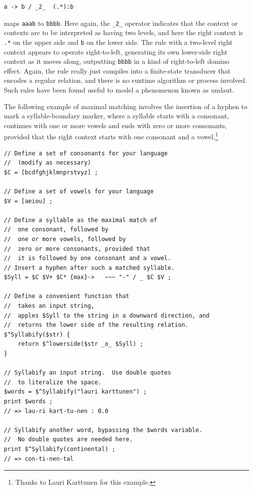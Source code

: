 \begin{Verbatim}
a -> b / _2_  (.*):b
\end{Verbatim}

\noindent
maps \texttt{aaab} to \texttt{bbbb}.  Here again, the \verb!_2_! operator indicates that the context or contexts are to
be interpreted as having two levels, and here the right context is \verb!.*! on the upper side and \verb!b! on the lower
side.  The rule with a two-level right context appears to
operate right-to-left, generating its own lower-side right context as it moves along, outputting \texttt{bbbb} in a kind
of right-to-left domino effect.
Again, the rule really just compiles into a finite-state transducer that encodes a regular
relation, and there is no runtime algorithm or process involved.
Such rules have been found useful to model a phenomenon known as umlaut.

The following example of maximal matching involves the insertion of a hyphen to mark a syllable-boundary
marker, where a syllable starts with a
consonant, continues with one or more vowels and ends with zero or more consonants,
provided that the right context starts with one consonant and a vowel.\footnote{Thanks to
Lauri Karttunen for this example.}

\begin{Verbatim}
// Define a set of consonants for your language
// 	(modify as necessary)
$C = [bcdfghjklmnprstvyz] ;

// Define a set of vowels for your language
$V = [aeiou] ;

// Define a syllable as the maximal match of
//	one consonant, followed by
//	one or more vowels, followed by
//	zero or more consonants, provided that
//	it is followed by one consonant and a vowel.
// Insert a hyphen after such a matched syllable.
$Syll = $C $V+ $C* {max}->   ~~~ "-" / _ $C $V ;

// Define a convenient function that 
//	takes an input string,
//	apples $Syll to the string in a downward direction, and
//	returns the lower side of the resulting relation.
$^Syllabify($str) { 
	return $^lowerside($str _o_ $Syll) ; 
}

// Syllabify an input string.  Use double quotes
//	to literalize the space.
$words = $^Syllabify("lauri karttunen") ;
print $words ;	
// => lau-ri kart-tu-nen : 0.0

// Syllabify another word, bypassing the $words variable.
//	No double quotes are needed here.
print $^Syllabify(continental) ;
// => con-ti-nen-tal
\end{Verbatim}

